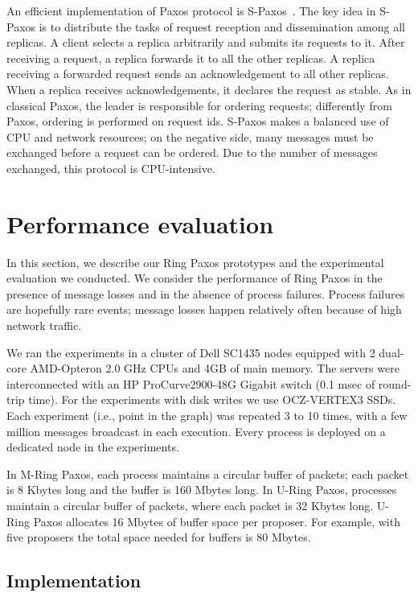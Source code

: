 \documentclass[final,3p,times,twocolumn,authoryear]{elsarticle}
\begin{document}
An efficient implementation of Paxos protocol is S-Paxos~\cite{spaxos}. The key idea in S-Paxos is to distribute the tasks of request reception and dissemination among all replicas. A client selects a replica arbitrarily and submits its requests to it. After receiving a request, a replica forwards it to all the other replicas. A replica receiving a forwarded request sends an acknowledgement to all other replicas. When a replica receives  acknowledgements, it declares the request as stable. As in classical Paxos, the leader is responsible for ordering requests; differently from Paxos, ordering is performed on request ids. S-Paxos makes a balanced use of CPU and network resources; on the negative side, many messages must be exchanged before a request can be ordered. Due to the number of messages exchanged, this protocol is CPU-intensive. 



\section{Performance evaluation}
\label{sec:perf}

In this section, we describe our Ring Paxos prototypes and the experimental evaluation we conducted. We consider the performance of Ring Paxos in the presence of message losses and in the absence of process failures. Process failures are hopefully rare events; message losses happen relatively often because of high network traffic.

We ran the experiments in a cluster of Dell SC1435 nodes equipped with 2 dual-core AMD-Opteron 2.0 GHz CPUs and 4GB of main memory. The servers were interconnected with an HP ProCurve2900-48G Gigabit switch (0.1 msec of round-trip time). For the experiments with disk writes we use OCZ-VERTEX3 SSDs. Each experiment (i.e., point in the graph) was repeated 3 to 10 times, with a few million messages broadcast in each execution. Every process is deployed on a dedicated node in the experiments.  



In M-Ring Paxos, each process maintains a circular buffer of packets; each packet is 8 Kbytes long and the buffer is 160 Mbytes long. In U-Ring Paxos, processes maintain a circular buffer of packets, where each packet is 32 Kbytes long. U-Ring Paxos allocates 16 Mbytes of buffer space per proposer. For example, with five proposers the total space needed for buffers is 80 Mbytes.


\subsection{Implementation}
\end{document}
